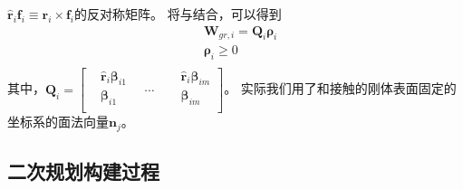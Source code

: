 ${{\hat{\boldsymbol{r}}}_{i}}{\boldsymbol{f}_{i}}\equiv {\boldsymbol{r}_{i}}\times {\boldsymbol{f}_{i}}$的反对称矩阵。
将与结合，可以得到
\begin{equation}
    \label{equ:wrench_matrix}
    \begin{aligned}
        & {{\boldsymbol{W}}_{gr,i}}={{\boldsymbol{Q}}_{i}}{{\boldsymbol{\rho}}_{i}} \\ 
       & {{\boldsymbol{\rho}}_{i}}\ge 0 \\ 
      \end{aligned}        
\end{equation}
其中，${{\boldsymbol{Q}}_{i}}=\left[ \begin{aligned}
    & {{{\hat{\boldsymbol{r}}}}_{i}}{{\boldsymbol{\beta}}_{i1}} \\ 
   & {{\boldsymbol{\beta}}_{i1}}\ \ \ \  \\ 
  \end{aligned} \right.\ \ \ \ \cdots \ \ \ \ \left. \begin{aligned}
    & {{{\hat{\boldsymbol{r}}}}_{i}}{{\boldsymbol{\beta}}_{im}} \\ 
   & {{\boldsymbol{\beta}}_{im}} \\ 
  \end{aligned} \right]
  $。
  实际我们用了和接触的刚体表面固定的坐标系的面法向量${{\boldsymbol{n}}_{j}}$。
\subsection{二次规划构建过程}


